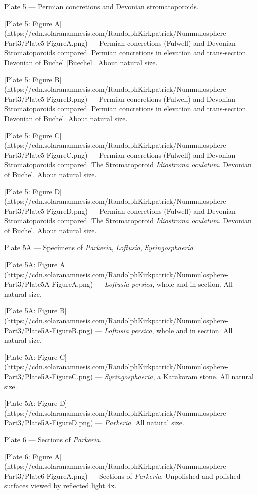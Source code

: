 \documentclass[a4paper, 12pt, oneside]{article}
\begin{document}
Plate 5 --- Permian concretions and Devonian stromatoporoids.

[Plate 5: Figure A](https://cdn.solaranamnesis.com/RandolphKirkpatrick/Nummulosphere-Part3/Plate5-FigureA.png) --- Permian concretions (Fulwell) and Devonian Stromatoporoids compared. Permian concretions in elevation and trans-section. Devonian of Buchel [Buechel]. About natural size.

[Plate 5: Figure B](https://cdn.solaranamnesis.com/RandolphKirkpatrick/Nummulosphere-Part3/Plate5-FigureB.png) --- Permian concretions (Fulwell) and Devonian Stromatoporoids compared. Permian concretions in elevation and trans-section. Devonian of Buchel. About natural size.

[Plate 5: Figure C](https://cdn.solaranamnesis.com/RandolphKirkpatrick/Nummulosphere-Part3/Plate5-FigureC.png) --- Permian concretions (Fulwell) and Devonian Stromatoporoids compared. The Stromatoporoid \emph{Idiostroma oculatum}. Devonian of Buchel. About natural size.

[Plate 5: Figure D](https://cdn.solaranamnesis.com/RandolphKirkpatrick/Nummulosphere-Part3/Plate5-FigureD.png) --- Permian concretions (Fulwell) and Devonian Stromatoporoids compared. The Stromatoporoid \emph{Idiostroma oculatum}. Devonian of Buchel. About natural size.

Plate 5A --- Specimens of \emph{Parkeria}, \emph{Loftusia}, \emph{Syringosphaeria}.

[Plate 5A: Figure A](https://cdn.solaranamnesis.com/RandolphKirkpatrick/Nummulosphere-Part3/Plate5A-FigureA.png) --- \emph{Loftusia persica}, whole and in section. All natural size.

[Plate 5A: Figure B](https://cdn.solaranamnesis.com/RandolphKirkpatrick/Nummulosphere-Part3/Plate5A-FigureB.png) --- \emph{Loftusia persica}, whole and in section. All natural size.

[Plate 5A: Figure C](https://cdn.solaranamnesis.com/RandolphKirkpatrick/Nummulosphere-Part3/Plate5A-FigureC.png) --- \emph{Syringosphaeria}, a Karakoram stone. All natural size.

[Plate 5A: Figure D](https://cdn.solaranamnesis.com/RandolphKirkpatrick/Nummulosphere-Part3/Plate5A-FigureD.png) --- \emph{Parkeria}. All natural size.

Plate 6 --- Sections of \emph{Parkeria}.

[Plate 6: Figure A](https://cdn.solaranamnesis.com/RandolphKirkpatrick/Nummulosphere-Part3/Plate6-FigureA.png) --- Sections of \emph{Parkeria}. Unpolished and polished surfaces viewed by reflected light 4x.
\end{document}
